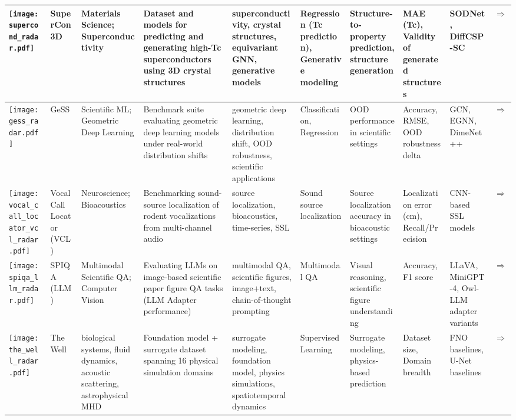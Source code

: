 \begin{landscape}
{\begin{longtable}{|p{}|p{}|p{}|p{}|p{}|p{}|p{}|p{}|p{}|p{}|}
\texttt{[image: supercond\_radar.pdf]} & SuperCon3D & Materials Science; Superconductivity & Dataset and models for predicting and generating high-Tc superconductors using 3D crystal structures & superconductivity, crystal structures, equivariant GNN, generative models & Regression (Tc prediction), Generative modeling & Structure-to-property prediction, structure generation & MAE (Tc), Validity of generated structures & SODNet, DiffCSP-SC & \cite{neurips2024_c4e3b55e}\href{https://neurips.cc/virtual/2024/poster/97553}{$\Rightarrow$} \\ \hline
\texttt{[image: gess\_radar.pdf]} & GeSS & Scientific ML; Geometric Deep Learning & Benchmark suite evaluating geometric deep learning models under real-world distribution shifts & geometric deep learning, distribution shift, OOD robustness, scientific applications & Classification, Regression & OOD performance in scientific settings & Accuracy, RMSE, OOD robustness delta & GCN, EGNN, DimeNet++ & \cite{neurips2024_a8063075}\href{https://neurips.cc/virtual/2024/poster/97816}{$\Rightarrow$} \\ \hline
\texttt{[image: vocal\_call\_locator\_vcl\_radar.pdf]} & Vocal Call Locator (VCL) & Neuroscience; Bioacoustics & Benchmarking sound-source localization of rodent vocalizations from multi-channel audio & source localization, bioacoustics, time-series, SSL & Sound source localization & Source localization accuracy in bioacoustic settings & Localization error (cm), Recall/Precision & CNN-based SSL models & \cite{neurips2024_c00d37d6}\href{https://neurips.cc/virtual/2024/poster/97470}{$\Rightarrow$} \\ \hline
\texttt{[image: spiqa\_llm\_radar.pdf]} & SPIQA (LLM) & Multimodal Scientific QA; Computer Vision & Evaluating LLMs on image-based scientific paper figure QA tasks (LLM Adapter performance) & multimodal QA, scientific figures, image+text, chain-of-thought prompting & Multimodal QA & Visual reasoning, scientific figure understanding & Accuracy, F1 score & LLaVA, MiniGPT-4, Owl-LLM adapter variants & \cite{pramanick2025spiqadatasetmultimodalquestion}\href{https://neurips.cc/virtual/2024/poster/97575}{$\Rightarrow$} \\ \hline
\texttt{[image: the\_well\_radar.pdf]} & The Well & biological systems, fluid dynamics, acoustic scattering, astrophysical MHD & Foundation model + surrogate dataset spanning 16 physical simulation domains & surrogate modeling, foundation model, physics simulations, spatiotemporal dynamics & Supervised Learning & Surrogate modeling, physics-based prediction & Dataset size, Domain breadth & FNO baselines, U-Net baselines & \cite{neurips2024_4f9a5acd}\href{https://polymathic-ai.org/the\_well/}{$\Rightarrow$} \\ \hline
\end{longtable}
}

\end{landscape}
